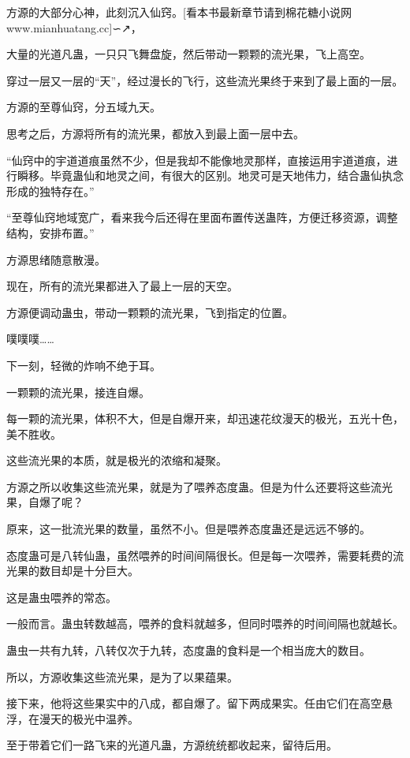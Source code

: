 
\begin{this_body}

方源的大部分心神，此刻沉入仙窍。[看本书最新章节请到棉花糖小说网www.mianhuatang.cc]∽↗，

大量的光道凡蛊，一只只飞舞盘旋，然后带动一颗颗的流光果，飞上高空。

穿过一层又一层的“天”，经过漫长的飞行，这些流光果终于来到了最上面的一层。

方源的至尊仙窍，分五域九天。

思考之后，方源将所有的流光果，都放入到最上面一层中去。

“仙窍中的宇道道痕虽然不少，但是我却不能像地灵那样，直接运用宇道道痕，进行瞬移。毕竟蛊仙和地灵之间，有很大的区别。地灵可是天地伟力，结合蛊仙执念形成的独特存在。”

“至尊仙窍地域宽广，看来我今后还得在里面布置传送蛊阵，方便迁移资源，调整结构，安排布置。”

方源思绪随意散漫。

现在，所有的流光果都进入了最上一层的天空。

方源便调动蛊虫，带动一颗颗的流光果，飞到指定的位置。

噗噗噗……

下一刻，轻微的炸响不绝于耳。

一颗颗的流光果，接连自爆。

每一颗的流光果，体积不大，但是自爆开来，却迅速花纹漫天的极光，五光十色，美不胜收。

这些流光果的本质，就是极光的浓缩和凝聚。

方源之所以收集这些流光果，就是为了喂养态度蛊。但是为什么还要将这些流光果，自爆了呢？

原来，这一批流光果的数量，虽然不小。但是喂养态度蛊还是远远不够的。

态度蛊可是八转仙蛊，虽然喂养的时间间隔很长。但是每一次喂养，需要耗费的流光果的数目却是十分巨大。

这是蛊虫喂养的常态。

一般而言。蛊虫转数越高，喂养的食料就越多，但同时喂养的时间间隔也就越长。

蛊虫一共有九转，八转仅次于九转，态度蛊的食料是一个相当庞大的数目。

所以，方源收集这些流光果，是为了以果蕴果。

接下来，他将这些果实中的八成，都自爆了。留下两成果实。任由它们在高空悬浮，在漫天的极光中温养。

至于带着它们一路飞来的光道凡蛊，方源统统都收起来，留待后用。


\end{this_body}
